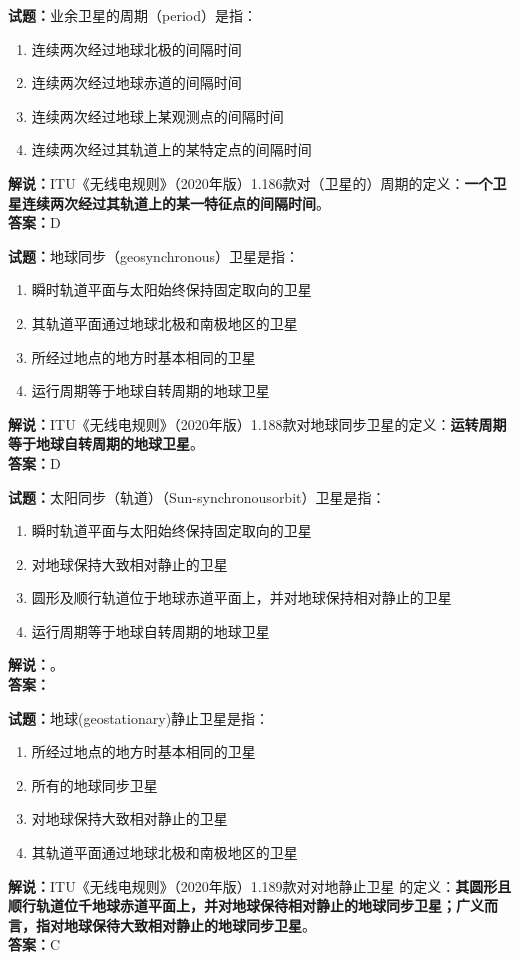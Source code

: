 \documentclass{ctexbook}
\begin{document}
\noindent\textbf{试题：}业余卫星的周期（period）是指：
\begin{enumerate}[leftmargin=3em]
  \item 连续两次经过地球北极的间隔时间
  \item 连续两次经过地球赤道的间隔时间
  \item 连续两次经过地球上某观测点的间隔时间
  \item 连续两次经过其轨道上的某特定点的间隔时间
\end{enumerate}
\noindent\textbf{解说：}ITU《无线电规则》（2020年版）1.186款对（卫星的）周期的定义：\textbf{一个卫星连续两次经过其轨道上的某一特征点的间隔时间}。\\\noindent\textbf{答案：}D

\bigskip

\noindent\textbf{试题：}地球同步（geosynchronous）卫星是指：
\begin{enumerate}[leftmargin=3em]
  \item 瞬时轨道平面与太阳始终保持固定取向的卫星
  \item 其轨道平面通过地球北极和南极地区的卫星
  \item 所经过地点的地方时基本相同的卫星
  \item 运行周期等于地球自转周期的地球卫星
\end{enumerate}
\noindent\textbf{解说：}ITU《无线电规则》（2020年版）1.188款对地球同步卫星的定义：\textbf{运转周期等于地球自转周期的地球卫星}。\\\noindent\textbf{答案：}D

\bigskip

\noindent\textbf{试题：}太阳同步（轨道）（Sun-synchronousorbit）卫星是指：
\begin{enumerate}[leftmargin=3em]
  \item 瞬时轨道平面与太阳始终保持固定取向的卫星
  \item 对地球保持大致相对静止的卫星
  \item 圆形及顺行轨道位于地球赤道平面上，并对地球保持相对静止的卫星
  \item 运行周期等于地球自转周期的地球卫星
\end{enumerate}
\noindent\textbf{解说：}\textbf{}。\\\noindent\textbf{答案：}

\bigskip

\noindent\textbf{试题：}地球(geostationary)静止卫星是指：
\begin{enumerate}[leftmargin=3em]
  \item 所经过地点的地方时基本相同的卫星
  \item 所有的地球同步卫星
  \item 对地球保持大致相对静止的卫星
  \item 其轨道平面通过地球北极和南极地区的卫星
\end{enumerate}
\noindent\textbf{解说：}ITU《无线电规则》（2020年版）1.189款对对地静止卫星
的定义：\textbf{其圆形且顺行轨道位千地球赤道平面上，并对地球保待相对静止的地球同步卫星；广义而言，指对地球保待大致相对静止的地球同步卫星}。\\\noindent\textbf{答案：}C
\end{document}
